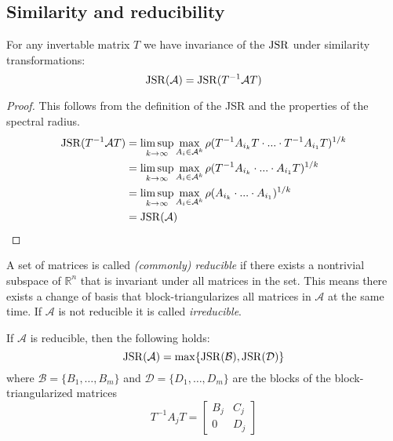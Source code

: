 \subsection*{Similarity and reducibility}

\begin{proposition}
    For any invertable matrix $T$ we have invariance of the $\operatorname{JSR}$ under similarity transformations:
    \begin{equation}
       \operatorname{JSR}(\mathcal{A}) = \operatorname{JSR}(T^{-1}\mathcal{A}T) 
    \end{equation}
\end{proposition}

\begin{proof}
    This follows from the definition of the JSR and the properties of the spectral radius.
    \begin{align*}
    \operatorname{JSR}(T^{-1}\mathcal{A}T) & = \limsup_{k \to \infty} \max_{A_i \in \mathcal{A}^k} \rho(T^{-1}A_{i_k}T \cdot ... \cdot T^{-1}A_{i_1}T)^{1/k}\\
    & = \limsup_{k \to \infty} \max_{A_i \in \mathcal{A}^k} \rho(T^{-1}A_{i_k} \cdot ... \cdot A_{i_1}T)^{1/k}\\
    & = \limsup_{k \to \infty} \max_{A_i \in \mathcal{A}^k} \rho(A_{i_k} \cdot ... \cdot A_{i_1})^{1/k}\\
    & = \operatorname{JSR}(\mathcal{A})   
    \end{align*}
\end{proof}

\begin{definition}
    A set of matrices is called \emph{(commonly) reducible} if there exists a nontrivial subspace of $\mathbb{R}^n$ that is invariant under all matrices in the set. This means there exists a change of basis that block-triangularizes all matrices in $\mathcal{A}$ at the same time. If $\mathcal{A}$ is not reducible it is called \emph{irreducible}. 
\end{definition}

\begin{proposition}
    \label{prop:triangularized}
    If $\mathcal{A}$ is reducible, then the following holds:
    \begin{equation}
        \operatorname{JSR}(\mathcal{A}) = \max \{ \operatorname{JSR}(\mathcal{B}), \operatorname{JSR}(\mathcal{D}) \}
    \end{equation}
    where $\mathcal{B} = \{B_1,\dots, B_m\}$ and $\mathcal{D} = \{D_1,\dots, D_m\}$ are the blocks of the block-triangularized matrices
    \[
        T^{-1}A_jT = 
        \begin{bmatrix}
        B_j & C_j \\
        0   & D_j 
        \end{bmatrix}
    \]
\end{proposition}

